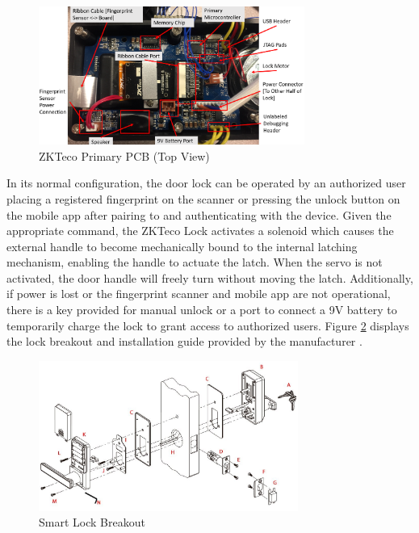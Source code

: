 \documentclass[conference]{IEEEtran}
\begin{document}
\begin{figure}[ht]
  \includegraphics[width=8.7cm]{images/MainPCB(Labeled).png}
  \caption{ZKTeco Primary PCB (Top View)}
  \label{fig:pcb1}
\end{figure}

\bigskip 

In its normal configuration, the door lock can be operated by an authorized user placing a registered fingerprint on the scanner or pressing the unlock button on the mobile app after pairing to and authenticating with the device. Given the appropriate command, the ZKTeco Lock activates a solenoid which causes the external handle to become mechanically bound to the internal latching mechanism, enabling the handle to actuate the latch. When the servo is not activated, the door handle will freely turn without moving the latch. Additionally, if power is lost or the fingerprint scanner and mobile app are not operational, there is a key provided for manual unlock or a port to connect a 9V battery to temporarily charge the lock to grant access to authorized users. Figure \ref{fig:lock} displays the lock breakout and installation guide provided by the manufacturer \cite{ZKTeco}.

\begin{figure}[ht]
  \includegraphics[width=8.5cm]{Lock.png}
  \caption{Smart Lock Breakout}
  \label{fig:lock}
\end{figure}

\bigskip 
\end{document}
